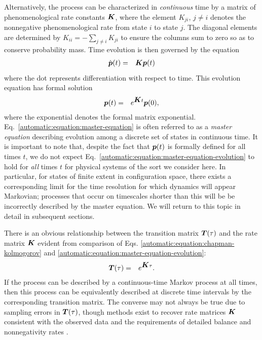 Alternatively, the process can be characterized in {\em continuous} time by a matrix of phenomenological rate constants ${\mbox{\boldmath{$K$}}}$, where the element $K_{ji}$, $j \ne i$ denotes the nonnegative phenomenological rate from state $i$ to state $j$.
The diagonal elements are determined by $K_{ii} = - \sum_{j \ne i} K_{ji}$ to ensure the columns sum to zero so as to conserve probability mass.
Time evolution is then governed by the equation
\begin{eqnarray}
\dot{{\mbox{\boldmath{$p$}}}}(t) &=& {\mbox{\boldmath{$K$}}} {\mbox{\boldmath{$p$}}}(t) \label{automatic:equation:master-equation}
\end{eqnarray}
where the dot represents differentiation with respect to time.
This evolution equation has formal solution
\begin{eqnarray}
{\mbox{\boldmath{$p$}}}(t) &=& e^{{\mbox{\boldmath{$K$}}} t} {\mbox{\boldmath{$p$}}}(0) \label{automatic:equation:master-equation-evolution} ,
\end{eqnarray}
where the exponential denotes the formal matrix exponential.
Eq.\ \ref{automatic:equation:master-equation} is often referred to as a \emph{master equation} \cite{vankampen,oppenheim:1977a} describing evolution among a discrete set of states in continuous time.
It is important to note that, despite the fact that ${\mbox{\boldmath{$p$}}}(t)$ is formally defined for all times $t$, we do not expect Eq.\ \ref{automatic:equation:master-equation-evolution} to hold for \emph{all} times $t$ for physical systems of the sort we consider here.
In particular, for states of finite extent in configuration space, there exists a corresponding limit for the time resolution for which dynamics will appear Markovian; processes that occur on timescales shorter than this will be be incorrectly described by the master equation.
We will return to this topic in detail in subsequent sections.

There is an obvious relationship between the transition matrix ${\mbox{\boldmath{$T$}}}(\tau)$ and the rate matrix ${\mbox{\boldmath{$K$}}}$ evident from comparison of Eqs. \ref{automatic:equation:chapman-kolmogorov} and \ref{automatic:equation:master-equation-evolution}:
\begin{eqnarray}
{\mbox{\boldmath{$T$}}}(\tau) &=& e^{{\mbox{\boldmath{$K$}}} \tau} . \label{automatic:equation:relation-between-transition-and-rate-matrices}
\end{eqnarray}
If the process can be described by a continuous-time Markov process at all times, then this process can be equivalently described at discrete time intervals by the corresponding transition matrix.
The converse may not always be true due to sampling errors in ${\mbox{\boldmath{$T$}}}(\tau)$, though methods exist to recover rate matrices ${\mbox{\boldmath{$K$}}}$ consistent with the observed data and the requirements of detailed balance and nonnegativity rates \cite{grubmueller:1994a,sriraman:2005a}.

